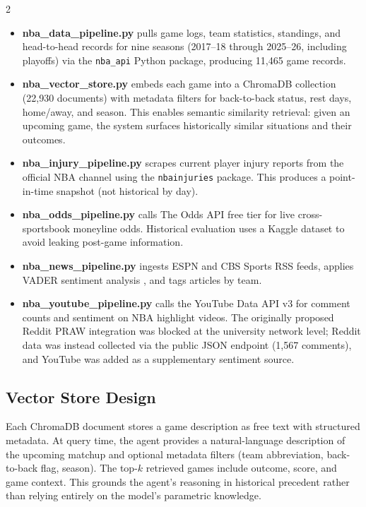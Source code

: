 \documentclass[11pt]{article}
\begin{document}
\begin{multicols}{2}
\begin{itemize}[leftmargin=*]
    \item \textbf{nba\_data\_pipeline.py} pulls game logs, team statistics, standings, and head-to-head records for nine seasons (2017--18 through 2025--26, including playoffs) via the \texttt{nba\_api} Python package, producing 11,465 game records.
    \item \textbf{nba\_vector\_store.py} embeds each game into a ChromaDB collection (22,930 documents) with metadata filters for back-to-back status, rest days, home/away, and season. This enables semantic similarity retrieval: given an upcoming game, the system surfaces historically similar situations and their outcomes.
    \item \textbf{nba\_injury\_pipeline.py} scrapes current player injury reports from the official NBA channel using the \texttt{nbainjuries} package. This produces a point-in-time snapshot (not historical by day).
    \item \textbf{nba\_odds\_pipeline.py} calls The Odds API free tier for live cross-sportsbook moneyline odds. Historical evaluation uses a Kaggle dataset \citep{qiu2024} to avoid leaking post-game information.
    \item \textbf{nba\_news\_pipeline.py} ingests ESPN and CBS Sports RSS feeds, applies VADER sentiment analysis \citep{hutto2014}, and tags articles by team.
    \item \textbf{nba\_youtube\_pipeline.py} calls the YouTube Data API v3 for comment counts and sentiment on NBA highlight videos. The originally proposed Reddit PRAW integration was blocked at the university network level; Reddit data was instead collected via the public JSON endpoint (1,567 comments), and YouTube was added as a supplementary sentiment source.
\end{itemize}

\subsection{Vector Store Design}

Each ChromaDB document stores a game description as free text with structured metadata. At query time, the agent provides a natural-language description of the upcoming matchup and optional metadata filters (team abbreviation, back-to-back flag, season). The top-$k$ retrieved games include outcome, score, and game context. This grounds the agent's reasoning in historical precedent rather than relying entirely on the model's parametric knowledge.


\end{multicols}
\end{document}
